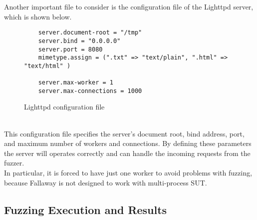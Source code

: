 Another important file to consider is the configuration file of the Lighttpd server, which is shown below.\\
\begin{figure}[H]
\begin{lstlisting}
    server.document-root = "/tmp"
    server.bind = "0.0.0.0"
    server.port = 8080
    mimetype.assign = (".txt" => "text/plain", ".html" => "text/html" )

    server.max-worker = 1 
    server.max-connections = 1000
\end{lstlisting}
\caption{Lighttpd configuration file}
\label{fig:lighttpd_conf_fallaway}
\end{figure}
\phantom{}\\
This configuration file specifies the server's document root, bind address, port, and maximum number of workers and connections. By defining these parameters the server will operates correctly and can handle the incoming requests from the fuzzer.
\\In particular, it is forced to have just one worker to avoid problems with fuzzing, because Fallaway is not designed to work with multi-process SUT.
\subsection{Fuzzing Execution and Results}

